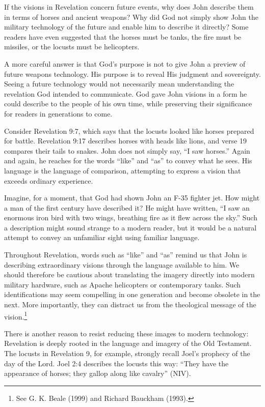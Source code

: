 If the visions in Revelation concern future events, why does John describe them in terms of horses and ancient weapons? Why did God not simply show John the military technology of the future and enable him to describe it directly? Some readers have even suggested that the horses must be tanks, the fire must be missiles, or the locusts must be helicopters.

A more careful answer is that God's purpose is not to give John a preview of future weapons technology. His purpose is to reveal His judgment and sovereignty. Seeing a future technology would not necessarily mean understanding the revelation God intended to communicate. God gave John visions in a form he could describe to the people of his own time, while preserving their significance for readers in generations to come.

Consider Revelation 9:7, which says that the locusts looked like horses prepared for battle. Revelation 9:17 describes horses with heads like lions, and verse 19 compares their tails to snakes. John does not simply say, “I saw horses.” Again and again, he reaches for the words “like” and “as” to convey what he sees. His language is the language of comparison, attempting to express a vision that exceeds ordinary experience.

Imagine, for a moment, that God had shown John an F-35 fighter jet. How might a man of the first century have described it? He might have written, “I saw an enormous iron bird with two wings, breathing fire as it flew across the sky.” Such a description might sound strange to a modern reader, but it would be a natural attempt to convey an unfamiliar sight using familiar language.

Throughout Revelation, words such as “like” and “as” remind us that John is describing extraordinary visions through the language available to him. We should therefore be cautious about translating the imagery directly into modern military hardware, such as Apache helicopters or contemporary tanks. Such identifications may seem compelling in one generation and become obsolete in the next. More importantly, they can distract us from the theological message of the vision.\footnote{See G. K. Beale (1999) and Richard Bauckham (1993).}

There is another reason to resist reducing these images to modern technology: Revelation is deeply rooted in the language and imagery of the Old Testament. The locusts in Revelation 9, for example, strongly recall Joel's prophecy of the day of the Lord. Joel 2:4 describes the locusts this way: “They have the appearance of horses; they gallop along like cavalry” (NIV).

